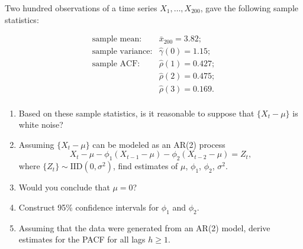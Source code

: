 \documentclass[12pt]{article}
\theoremstyle{definition}
\newenvironment{custompbm}[1]
  {\renewcommand\theproblem{#1}\problem}
  {\endproblem}
\begin{document}
\begin{custompbm}{5.4}
  Two hundred observations of a time series $X_1,\dots, X_{200}$, gave the following
  sample statistics:

  \[
  \begin{array}{ll}
    \text{sample mean:} & \bar{x}_{200} = 3.82; \\
    \text{sample variance:} & \hat{\gamma}(0) = 1.15; \\
    \text{sample ACF:} & \hat{\rho}(1) = 0.427;\\
    & \hat{\rho}(2) = 0.475;\\
    & \hat{\rho}(3) = 0.169.\\
  \end{array}
  \]

  \begin{enumerate}
    \item Based on these sample statistics, is it reasonable to suppose that
      $\{X_t - \mu\}$ is white noise?
    \item Assuming $\{X_t - \mu\}$ can be modeled as an AR(2) process
      \[
        X_t - \mu - \phi_1(X_{t-1} - \mu) - \phi_2(X_{t-2} - \mu) = Z_t,
      \]
      where $\{Z_t\} \sim \text{IID}(0, \sigma^2)$, find estimates of $\mu$, $\phi_1$, $\phi_2$, $\sigma^2$.
    \item Would you conclude that $\mu = 0$?
    \item Construct 95\% confidence intervals for $\phi_1$ and $\phi_2$.
    \item Assuming that the data were generated from an AR(2) model, derive estimates for the PACF for all lags $h \geq 1$.
  \end{enumerate}
\end{custompbm}
\end{document}
